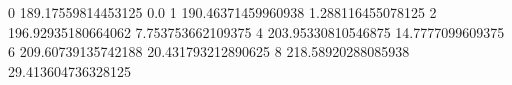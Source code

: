 0 189.17559814453125 0.0
1 190.46371459960938 1.288116455078125
2 196.92935180664062 7.753753662109375
4 203.95330810546875 14.7777099609375
6 209.60739135742188 20.431793212890625
8 218.58920288085938 29.413604736328125
